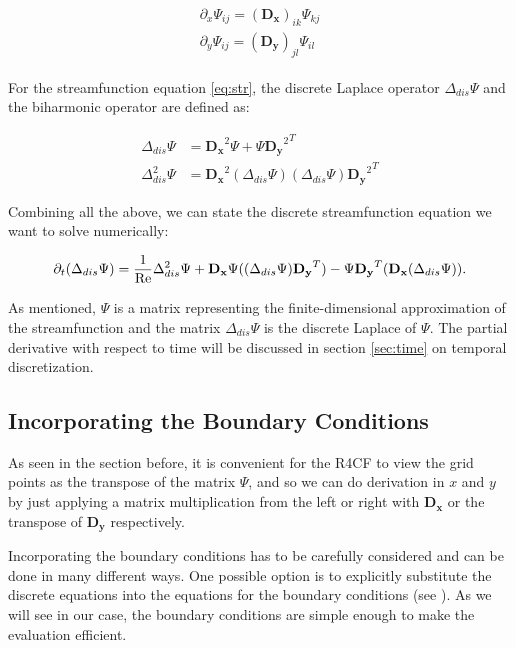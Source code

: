 \begin{align}
  \begin{split}
  \partial_x \Psi_{ij} = (\mathbf{D_x})_{ik} \Psi_{kj} \\
  \partial_y \Psi_{ij} = (\mathbf{D_y})_{jl} \Psi_{il}
  \end{split}
\label{eq:discr_der}
\end{align}

For the streamfunction equation \eqref{eq:str}, the discrete Laplace operator
$\Delta_{dis} \Psi$ and the biharmonic operator are defined as:

\begin{align}
  \Delta_{dis} \Psi &= \mathbf{D_x}^2\Psi + \Psi{\mathbf{D_y}^2}^T \\
  \Delta_{dis}^2 \Psi &= \mathbf{D_x}^2(\Delta_{dis} \Psi) (\Delta_{dis}
    \Psi){\mathbf{D_y}^2}^T 
\end{align}

Combining all the above, we can state the discrete streamfunction equation we
want to solve numerically:

\begin{align}
\partial_t (\Delta_{dis} \Psi) = \frac{1}{\mathrm{Re}} \Delta_{dis}^2 \Psi
  + \mathbf{D_x}\Psi((\Delta_{dis}\Psi)\mathbf{D_y}^T)
  - \Psi\mathbf{D_y}^T (\mathbf{D_x}(\Delta_{dis} \Psi)). 
\label{eq:str_dis}
\end{align}

As mentioned, $\Psi$ is a matrix representing the finite-dimensional
approximation of the streamfunction and the matrix $\Delta_{dis} \Psi$ is the
discrete Laplace of $\Psi$. The partial derivative with respect to time will be
discussed in section \ref{sec:time} on temporal discretization.

\subsection{Incorporating the Boundary Conditions} \label{sec:bc}

As seen in the section before, it is convenient for the R4CF to view the grid
points as the transpose of the matrix $\Psi$, and so we can do derivation in
$x$ and $y$ by just applying a matrix multiplication from the left or right
with $\mathbf{D_x}$ or the transpose of $\mathbf{D_y}$ respectively. 

Incorporating the boundary conditions has to be carefully considered and can be
done in many different ways. One possible option is to explicitly substitute
the discrete equations into the equations for the boundary conditions (see
\cite{meseguer2020}). As we will see in our case, the boundary conditions are
simple enough to make the evaluation efficient.

